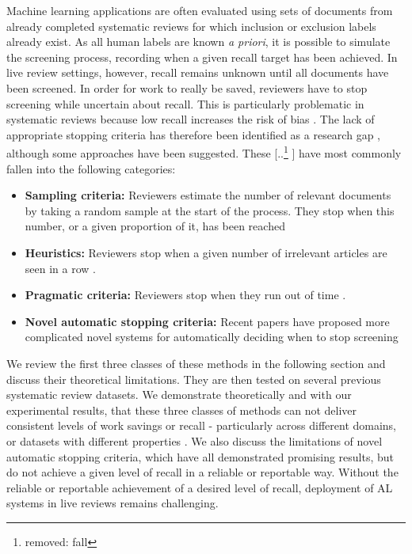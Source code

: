 \documentclass{bmcart}
\providecommand{\DIFadd}[1]{{\protect\color{blue} \sf #1}} %
\providecommand{\DIFdel}[1]{{\protect\color{red} [..\footnote{removed: #1} ]}} %
\providecommand{\DIFaddbegin}{} %
\providecommand{\DIFaddend}{} %
\providecommand{\DIFdelbegin}{} %
\providecommand{\DIFdelend}{} %
\newcommand{\DIFscaledelfig}{0.5}
\newlength{\DIFdelgraphicswidth} %
\newlength{\DIFdelgraphicsheight} %
\newcommand{\DIFaddincludegraphics}[2][]{{\color{blue}\fbox{\DIFOincludegraphics[#1]{#2}}}} %
\newcommand{\DIFdelincludegraphics}[2][]{%
\sbox{\DIFdelgraphicsbox}{\DIFOincludegraphics[#1]{#2}}%
\settoboxwidth{\DIFdelgraphicswidth}{\DIFdelgraphicsbox} %
\settoboxtotalheight{\DIFdelgraphicsheight}{\DIFdelgraphicsbox} %
\scalebox{\DIFscaledelfig}{%
\parbox[b]{\DIFdelgraphicswidth}{\usebox{\DIFdelgraphicsbox}\\[-\baselineskip] \rule{\DIFdelgraphicswidth}{0em}}\llap{\resizebox{\DIFdelgraphicswidth}{\DIFdelgraphicsheight}{%
\setlength{\unitlength}{\DIFdelgraphicswidth}%
\begin{picture}(1,1)%
\thicklines\linethickness{2pt} %
{\color[rgb]{1,0,0}\put(0,0){\framebox(1,1){}}}%
{\color[rgb]{1,0,0}\put(0,0){\line( 1,1){1}}}%
{\color[rgb]{1,0,0}\put(0,1){\line(1,-1){1}}}%
\end{picture}%
}\hspace*{3pt}}} %
} %
\DeclareRobustCommand{\DIFaddbegin}{\DIFOaddbegin \let\includegraphics\DIFaddincludegraphics} %
\DeclareRobustCommand{\DIFaddend}{\DIFOaddend \let\includegraphics\DIFOincludegraphics} %
\DeclareRobustCommand{\DIFdelbegin}{\DIFOdelbegin \let\includegraphics\DIFdelincludegraphics} %
\DeclareRobustCommand{\DIFdelend}{\DIFOaddend \let\includegraphics\DIFOincludegraphics} %
\begin{document}
	Machine learning applications are often evaluated using sets of documents from already completed systematic reviews for which inclusion or exclusion labels already exist. 
	As all human labels are known \textit{a priori}, it is possible to simulate the screening process, recording when a given recall target has been achieved.
	In live review settings, however, recall remains unknown until all documents have been screened. 
	In order for work to really be saved, reviewers have to stop screening while uncertain about recall. 
	This is particularly problematic in systematic reviews because low recall increases the risk of bias \cite{Lefebvre2011}.
	The lack of appropriate stopping criteria has therefore been identified as a research gap \cite{bannach-brown2019, Marshall2019}, although some approaches have been suggested. These \DIFdelbegin \DIFdel{fall }\DIFdelend \DIFaddbegin \DIFadd{have most commonly fallen }\DIFaddend into the following categories:
	\begin{itemize}
		\item \textbf{Sampling criteria:} Reviewers estimate the number of relevant documents by taking a random sample at the start of the process. They stop when this number, or a given proportion of it, has been reached \cite{Shemilt2014}
		\item \textbf{Heuristics:} Reviewers stop when a given number of irrelevant articles are seen in a row \cite{Jonnalagadda2013, Przybya2018}. 
		\item \textbf{Pragmatic criteria:} Reviewers stop when they run out of time \cite{miwa2014}. 
		\DIFaddbegin \item \DIFadd{\textbf{Novel automatic stopping criteria:} Recent papers have proposed more complicated novel systems for automatically deciding when to stop screening \cite{Yu2019, DiNunzio2018, Howard2020}
	}\DIFaddend \end{itemize}

	
	We review \DIFaddbegin \DIFadd{the first three classes of }\DIFaddend these methods in the following section and discuss their theoretical limitations. They are then tested on several previous systematic review datasets.
	We demonstrate theoretically and with our experimental results, that these \DIFaddbegin \DIFadd{three classes of }\DIFaddend methods can not deliver consistent levels of work savings or recall - particularly across different domains, or datasets with different properties \cite{OMara-Eves2015}. \DIFaddbegin \DIFadd{We also discuss the limitations of novel automatic stopping criteria, which have all demonstrated promising results, but do not achieve a given level of recall in a reliable or reportable way.   
	}\DIFaddend Without the reliable or reportable achievement of a desired level of recall, deployment of AL systems in live reviews remains challenging.
\end{document}
